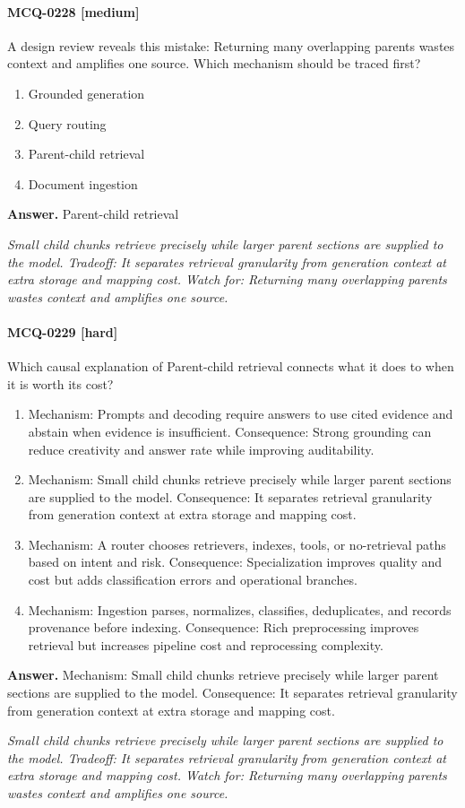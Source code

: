 \paragraph{MCQ-0228 [medium]} A design review reveals this mistake: Returning many overlapping parents wastes context and amplifies one source. Which mechanism should be traced first?
\begin{enumerate}[label=\Alph*.]
\item Grounded generation
\item Query routing
\item Parent-child retrieval
\item Document ingestion
\end{enumerate}
\noindent\textbf{Answer.} Parent-child retrieval
\par\textit{Small child chunks retrieve precisely while larger parent sections are supplied to the model. Tradeoff: It separates retrieval granularity from generation context at extra storage and mapping cost. Watch for: Returning many overlapping parents wastes context and amplifies one source.}
\paragraph{MCQ-0229 [hard]} Which causal explanation of Parent-child retrieval connects what it does to when it is worth its cost?
\begin{enumerate}[label=\Alph*.]
\item Mechanism: Prompts and decoding require answers to use cited evidence and abstain when evidence is insufficient. Consequence: Strong grounding can reduce creativity and answer rate while improving auditability.
\item Mechanism: Small child chunks retrieve precisely while larger parent sections are supplied to the model. Consequence: It separates retrieval granularity from generation context at extra storage and mapping cost.
\item Mechanism: A router chooses retrievers, indexes, tools, or no-retrieval paths based on intent and risk. Consequence: Specialization improves quality and cost but adds classification errors and operational branches.
\item Mechanism: Ingestion parses, normalizes, classifies, deduplicates, and records provenance before indexing. Consequence: Rich preprocessing improves retrieval but increases pipeline cost and reprocessing complexity.
\end{enumerate}
\noindent\textbf{Answer.} Mechanism: Small child chunks retrieve precisely while larger parent sections are supplied to the model. Consequence: It separates retrieval granularity from generation context at extra storage and mapping cost.
\par\textit{Small child chunks retrieve precisely while larger parent sections are supplied to the model. Tradeoff: It separates retrieval granularity from generation context at extra storage and mapping cost. Watch for: Returning many overlapping parents wastes context and amplifies one source.}
